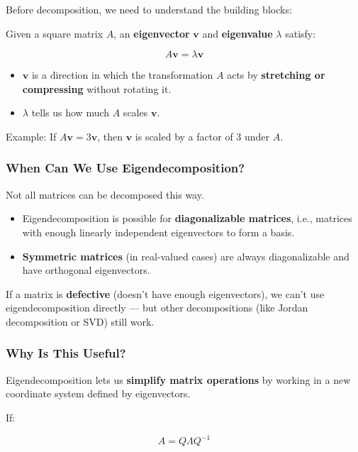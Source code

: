 \documentclass[
  letterpaper,
  DIV=11,
  numbers=noendperiod]{scrartcl}
\providecommand{\tightlist}{%
  \setlength{\itemsep}{0pt}\setlength{\parskip}{0pt}}\usepackage{longtable,booktabs,array}
\begin{document}
Before decomposition, we need to understand the building blocks:

Given a square matrix \(A\), an \textbf{eigenvector} \(\mathbf{v}\) and
\textbf{eigenvalue} \(\lambda\) satisfy:

\[
A \mathbf{v} = \lambda \mathbf{v}
\]

\begin{itemize}
\tightlist
\item
  \(\mathbf{v}\) is a direction in which the transformation \(A\) acts
  by \textbf{stretching or compressing} without rotating it.
\item
  \(\lambda\) tells us how much \(A\) scales \(\mathbf{v}\).
\end{itemize}

Example: If \(A \mathbf{v} = 3 \mathbf{v}\), then \(\mathbf{v}\) is
scaled by a factor of 3 under \(A\).

\subsubsection{When Can We Use
Eigendecomposition?}\label{when-can-we-use-eigendecomposition}

Not all matrices can be decomposed this way.

\begin{itemize}
\tightlist
\item
  Eigendecomposition is possible for \textbf{diagonalizable matrices},
  i.e., matrices with enough linearly independent eigenvectors to form a
  basis.
\item
  \textbf{Symmetric matrices} (in real-valued cases) are always
  diagonalizable and have orthogonal eigenvectors.
\end{itemize}

If a matrix is \textbf{defective} (doesn't have enough eigenvectors), we
can't use eigendecomposition directly --- but other decompositions (like
Jordan decomposition or SVD) still work.

\subsubsection{Why Is This Useful?}\label{why-is-this-useful}

Eigendecomposition lets us \textbf{simplify matrix operations} by
working in a new coordinate system defined by eigenvectors.

If:

\[
A = Q \Lambda Q^{-1}
\]
\end{document}
